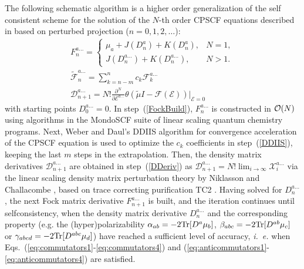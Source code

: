 \documentclass[prl,aps,twocolumn,showpacs,twocolumngrid,superbib]{revtex4}
\def\Tr{{\rm Tr}}
\def\F{\mathcal{F}}
\def\D{\mathcal{D}}
\def\X{\mathcal{X}}
\def\E{\mathcal{E}}
\begin{document}
The following schematic algorithm is a higher order generalization of the
self consistent scheme for the solution of the $N$-th order CPSCF equations described 
in \cite{Weber04} based on perturbed projection ($n = 0,1,2,\ldots$):
\begin{subequations}
  \begin{gather}
    F^{a\ldots}_{n}= \left\{
    \begin{array}{ll}
      \mu_a+J(D^{a}_n)+K(D^{a}_n), & N=1\label{FockBuild},\\
      J(D^{a\ldots}_n)+K(D^{a\ldots}_n), & N>1.
    \end{array}\right.\\
    \displaystyle\widetilde{\F}^{a\ldots}_{n}=\sum_{k=n-m}^{n}c_k \F^{a\ldots}_{k} \label{DDIIS} \\
    \displaystyle\D^{a\ldots}_{n+1}=N!
    \frac{\partial^N}{\partial\E^{a\ldots}}\theta(\tilde{\mu}I-
    \F(\E))\bigg|_{\E=0} \label{DDeriv}
  \end{gather} 
\end{subequations}
with starting points $D^{a\ldots}_0=0$. In step~(\ref{FockBuild}),  
$F^{a\ldots}_n$ is constructed in ${\cal O}(N)$ using algorithms 
\cite{MChallacombe97,ESchwegler97} in the {\sc MondoSCF} \cite{MondoSCF} 
suite of linear scaling quantum chemistry programs.  Next,
Weber and Daul's DDIIS algorithm for convergence acceleration 
of the CPSCF equation \cite{Weber_2003} is used to optimize 
the $c_k$ coefficients in step~(\ref{DDIIS}), 
keeping the last $m$ steps in the extrapolation.
Then, the density matrix derivatives $\D^{a\ldots}_{n+1}$ are obtained
in step~(\ref{DDeriv}) as $\D^{a\ldots}_{n+1}=N!\lim_{i\to\infty}\X^{a\ldots}_i$
via the linear scaling density matrix perturbation theory by Niklasson
and Challacombe \cite{ANiklasson04}, based on 
trace correcting purification TC2 \cite{ANiklasson02A}. Having solved 
for $D^{a\ldots}_n$, the next Fock 
matrix derivative $F^{a\ldots}_{n+1}$ is built, and the iteration continues until 
selfconsistency, when the density matrix derivative $D^{a\ldots}_n$ and the 
corresponding property (e.g. the (hyper)polarizability $\alpha_{ab}=-2\Tr[D^a\mu_b]$, 
$\beta_{abc}=-2\Tr[D^{ab}\mu_c]$ or $\gamma_{abcd}=-2\Tr[D^{abc}\mu_d]$)
have reached a sufficient level of accuracy, {\em i.\ e.} when 
Eqs.\ (\ref{eq:commutators1}-\ref{eq:commutators4}) 
and (\ref{eq:anticommutators1}-\ref{eq:anticommutators4}) are satisfied.
\end{document}
